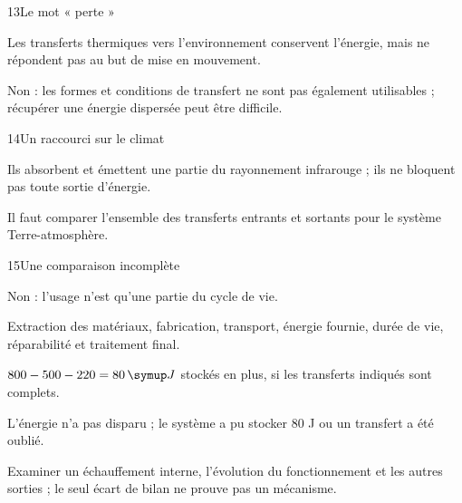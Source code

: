 \par\noindent\begin{minipage}{\linewidth}
\begin{corrige}{13}{Le mot « perte »}
\begin{questions}
\item Les transferts thermiques vers l’environnement conservent l’énergie, mais ne répondent pas au but de mise en mouvement.
\item Non : les formes et conditions de transfert ne sont pas également utilisables ; récupérer une énergie dispersée peut être difficile.
\end{questions}
\end{corrige}
\end{minipage}
\par\noindent\begin{minipage}{\linewidth}
\begin{corrige}{14}{Un raccourci sur le climat}
\begin{questions}
\item Ils absorbent et émettent une partie du rayonnement infrarouge ; ils ne bloquent pas toute sortie d’énergie.
\item Il faut comparer l’ensemble des transferts entrants et sortants pour le système Terre-atmosphère.
\end{questions}
\end{corrige}
\end{minipage}
\par\noindent\begin{minipage}{\linewidth}
\begin{corrige}{15}{Une comparaison incomplète}
\begin{questions}
\item Non : l’usage n’est qu’une partie du cycle de vie.
\item Extraction des matériaux, fabrication, transport, énergie fournie, durée de vie, réparabilité et traitement final.
\end{questions}
\end{corrige}
\end{minipage}
\par\noindent\begin{minipage}{\linewidth}
\label{cor-defi-12}\begin{questions}
\item $800-500-220=80\unite J$ stockés en plus, si les transferts indiqués sont complets.
\item L’énergie n’a pas disparu ; le système a pu stocker 80 J ou un transfert a été oublié.
\item Examiner un échauffement interne, l’évolution du fonctionnement et les autres sorties ; le seul écart de bilan ne prouve pas un mécanisme.
\end{questions}
\end{minipage}
